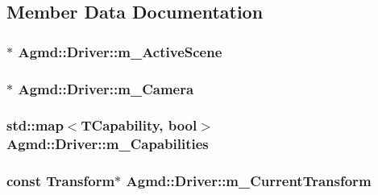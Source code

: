 \subsection{Member Data Documentation}
\hypertarget{class_agmd_1_1_driver_a41985d98cdad01df5d16af9e74df63a8}{
\subsubsection[{m\+\_\+\+Active\+Scene}]{$\ast$ Agmd\+::\+Driver\+::m\+\_\+\+Active\+Scene\hspace{0.3cm}{\ttfamily [protected]}}}\label{class_agmd_1_1_driver_a41985d98cdad01df5d16af9e74df63a8}
\hypertarget{class_agmd_1_1_driver_a7e7ad50240452ac418ff0d2ab4cd5def}{
\subsubsection[{m\+\_\+\+Camera}]{$\ast$ Agmd\+::\+Driver\+::m\+\_\+\+Camera\hspace{0.3cm}{\ttfamily [protected]}}}\label{class_agmd_1_1_driver_a7e7ad50240452ac418ff0d2ab4cd5def}
\hypertarget{class_agmd_1_1_driver_a8992152f99b8f034fa91e90907874fd3}{
\subsubsection[{m\+\_\+\+Capabilities}]{\setlength{\rightskip}{0pt plus 5cm}std\+::map$<${\bf T\+Capability}, bool$>$ Agmd\+::\+Driver\+::m\+\_\+\+Capabilities\hspace{0.3cm}{\ttfamily [protected]}}}\label{class_agmd_1_1_driver_a8992152f99b8f034fa91e90907874fd3}
\hypertarget{class_agmd_1_1_driver_a6e2e70d57c02cf64c266f0cf556afa38}{
\subsubsection[{m\+\_\+\+Current\+Transform}]{\setlength{\rightskip}{0pt plus 5cm}const {\bf Transform}$\ast$ Agmd\+::\+Driver\+::m\+\_\+\+Current\+Transform\hspace{0.3cm}{\ttfamily [protected]}}}\label{class_agmd_1_1_driver_a6e2e70d57c02cf64c266f0cf556afa38}
